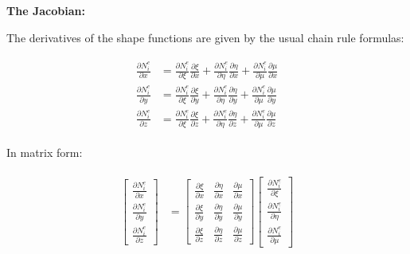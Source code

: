 \documentclass[10pt,b5paper,titlepage]{book}
\newenvironment{eqarray}
{
    \begin{eqnarray}
        \begin{aligned}
}
{
        \end{aligned}
    \end{eqnarray}
}
\begin{document}
\textbf{The Jacobian:}

The derivatives of the shape functions are given by the usual chain rule formulas:

\begin{eqarray}
    \frac{\partial N_i^e}{\partial x} &=
        \frac{\partial N_i^e}{\partial \xi} \frac{\partial \xi}{\partial x} +
        \frac{\partial N_i^e}{\partial \eta} \frac{\partial \eta}{\partial x} +
        \frac{\partial N_i^e}{\partial \mu} \frac{\partial \mu}{\partial x}\\
    \frac{\partial N_i^e}{\partial y} &=
        \frac{\partial N_i^e}{\partial \xi} \frac{\partial \xi}{\partial y} +
        \frac{\partial N_i^e}{\partial \eta} \frac{\partial \eta}{\partial y} +
        \frac{\partial N_i^e}{\partial \mu} \frac{\partial \mu}{\partial y}\\
    \frac{\partial N_i^e}{\partial z} &=
        \frac{\partial N_i^e}{\partial \xi} \frac{\partial \xi}{\partial z} +
        \frac{\partial N_i^e}{\partial \eta} \frac{\partial \eta}{\partial z} +
        \frac{\partial N_i^e}{\partial \mu} \frac{\partial \mu}{\partial z}
\end{eqarray}

In matrix form:

\begin{eqarray}
    \begin{bmatrix}
        \frac{\partial N_i^e}{\partial x}\\
        \frac{\partial N_i^e}{\partial y}\\
        \frac{\partial N_i^e}{\partial z}
    \end{bmatrix} &=
    \begin{bmatrix}
        \frac{\partial \xi}{\partial x} &
        \frac{\partial \eta}{\partial x} &
        \frac{\partial \mu}{\partial x}\\
        \frac{\partial \xi}{\partial y} &
        \frac{\partial \eta}{\partial y} &
        \frac{\partial \mu}{\partial y}\\
        \frac{\partial \xi}{\partial z} &
        \frac{\partial \eta}{\partial z} &
        \frac{\partial \mu}{\partial z}
    \end{bmatrix}
    \begin{bmatrix}
        \frac{\partial N_i^e}{\partial \xi}\\
        \frac{\partial N_i^e}{\partial \eta}\\
        \frac{\partial N_i^e}{\partial \mu}
    \end{bmatrix}
\end{eqarray}
\end{document}
